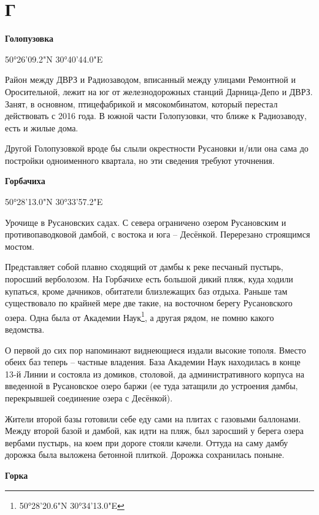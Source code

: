 \chapter*{Г}

\textbf{Голопузовка}

50°26'09.2"N 30°40'44.0"E

Район между ДВРЗ и Радиозаводом, вписанный между улицами Ремонтной и Оросительной, лежит на юг от железнодорожных станций Дарница-Депо и ДВРЗ. Занят, в основном, птицефабрикой и мясокомбинатом, который перестал действовать с 2016 года. В южной части Голопузовки, что ближе к Радиозаводу, есть и жилые дома.

Другой Голопузовкой вроде бы слыли окрестности Русановки и/или она сама до постройки одноименного квартала, но эти сведения требуют уточнения.\\

\medskip

\textbf{Горбачиха}

50°28'13.0"N 30°33'57.2"E

Урочище в Русановских садах. С севера ограничено озером Русановским и противопаводковой дамбой, с востока и юга – Десёнкой. Перерезано строящимся мостом.

Представляет собой плавно сходящий от дамбы к реке песчаный пустырь, поросший верболозом. На Горбачихе есть большой дикий пляж, куда ходили  купаться, кроме дачников, обитатели близлежащих баз отдыха. Раньше там существовало по крайней мере две такие, на восточном берегу Русановского озера. Одна была от Академии Наук\footnote{50°28'20.6"N 30°34'13.0"E}, а другая рядом, не помню какого ведомства.

О первой до сих пор напоминают виднеющиеся издали высокие тополя. Вместо обеих баз теперь – частные владения. База Академии Наук находилась в конце 13-й Линии и состояла из домиков, столовой, да административного корпуса на введенной в Русановское озеро баржи (ее туда затащили до устроения дамбы, перекрывшей соединение озера с Десёнкой).

Жители второй базы готовили себе еду сами на плитах с газовыми баллонами. Между второй базой и дамбой, как идти на пляж, был заросший у берега озера вербами пустырь, на коем при дороге стояли качели. Оттуда на саму дамбу дорожка была выложена бетонной плиткой. Дорожка сохранилась поныне.\\

\medskip

\textbf{Горка}


